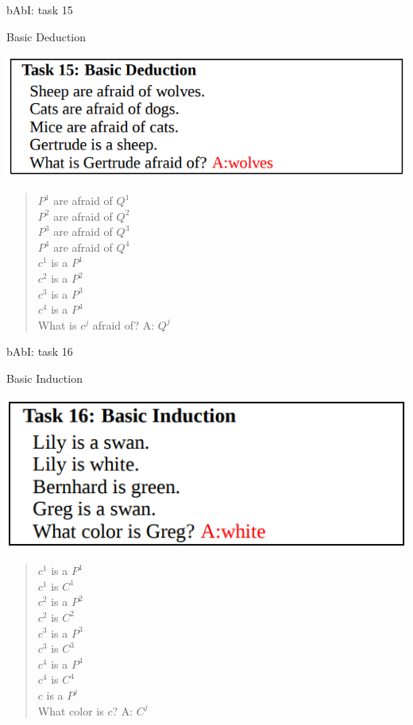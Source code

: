 \documentclass[10pt]{beamer}
\begin{document}
\begin{frame}{bAbI: task 15}

\alert{Basic Deduction}

\begin{center}
\includegraphics[scale=0.28]{images/babi15.png}
\end{center}
\begin{quote} 
\centering 
$P^{1}$ are afraid of $Q^{1}$\\
$P^{2}$ are afraid of $Q^{2}$\\
$P^{3}$ are afraid of $Q^{3}$\\
$P^{4}$ are afraid of $Q^{4}$\\
$c^{1}$ is a $P^{1}$\\
$c^{2}$ is a $P^{2}$\\
$c^{3}$ is a $P^{3}$\\
$c^{4}$ is a $P^{4}$\\
What is $c^j$ afraid of? \alert{A: $Q^j$}\\
\end{quote}


\end{frame}


\begin{frame}{bAbI: task 16}

\alert{Basic Induction}

\begin{center}
\includegraphics[scale=0.28]{images/babi16.png}
\end{center}
\begin{quote} 
\centering 
$c^{1}$ is a $P^{1}$\\
$c^{1}$ is $C^{1}$\\
$c^{2}$ is a $P^{2}$\\
$c^{2}$ is $C^{2}$\\
$c^{3}$ is a $P^{3}$\\
$c^{3}$ is $C^{3}$\\
$c^{4}$ is a $P^{4}$\\
$c^{4}$ is $C^{4}$\\
$c$ is a $P^{j}$\\
What color is $c$? \alert{A: $C^j$}\\
\end{quote}

\end{frame}
\end{document}
